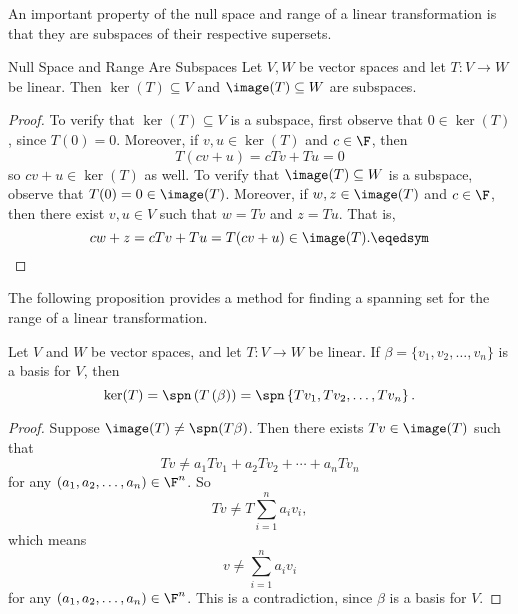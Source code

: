\documentclass[linearalgebraI]{subfiles}
\begin{document}
    \begin{remark}
        An important property of the null space and range of a linear transformation is that they are subspaces of their respective supersets.
    \end{remark}

    \begin{prop}{Null Space and Range Are Subspaces}
        Let $V, W$ be vector spaces and let $T:V\to W$ be linear. Then $\ker(T)\subseteq V$ and $\image(T)\subseteq W$ are subspaces.
    \end{prop}

    \begin{proof}
        To verify that $\ker(T)\subseteq V$ is a subspace, first observe that $0\in\ker(T)$, since $T(0)=0$. Moreover, if $v,u\in\ker(T)$ and $c\in\F$, then
        \begin{equation*}
            T(cv+u)=cTv+Tu=0
        \end{equation*}
        so $cv+u\in\ker(T)$ as well. To verify that $\image(T)\subseteq W$ is a subspace, observe that $T(0) = 0\in\image(T)$. Moreover, if $w,z\in\image(T)$ and $c\in\F$, then there exist $v,u\in V$ such that $w=Tv$ and $z=Tu$. That is,
        \begin{equation*}
            cw+z = cTv+Tu = T(cv+u)\in\image(T). \eqedsym
        \end{equation*}
    \end{proof}

    \begin{remark}
        The following proposition provides a method for finding a spanning set for the range of a linear transformation.
    \end{remark}

    \begin{prop}{}
        Let $V$ and $W$ be vector spaces, and let $T: V\to W$ be linear. If $\beta = \lbrace v_1, v_2, \ldots, v_n \rbrace$ is a basis for $V$, then
        \begin{equation*}
            \ker(T) = \spn\left( T\left( \beta \right)  \right) = \spn\left\lbrace Tv_1, Tv_2, \ldots, Tv_n \right\rbrace.
        \end{equation*}
    \end{prop}

    \begin{proof}
        Suppose $\image(T)\neq \spn(T\beta)$. Then there exists $Tv\in \image(T)$ such that
        \begin{equation*}
            Tv\neq a_1Tv_1 + a_2Tv_2 + \cdots + a_nTv_n
        \end{equation*}
        for any $(a_1, a_2, \ldots, a_n)\in \F^n$. So
        \begin{equation*}
            Tv\neq T\sum^n_{i=1}a_iv_i,
        \end{equation*}
        which means
        \begin{equation*}
            v\neq \sum^n_{i=1}a_iv_i
        \end{equation*}
        for any $(a_1, a_2, \ldots, a_n)\in \F^n$. This is a contradiction, since $\beta$ is a basis for $V$.
    \end{proof}
\end{document}
